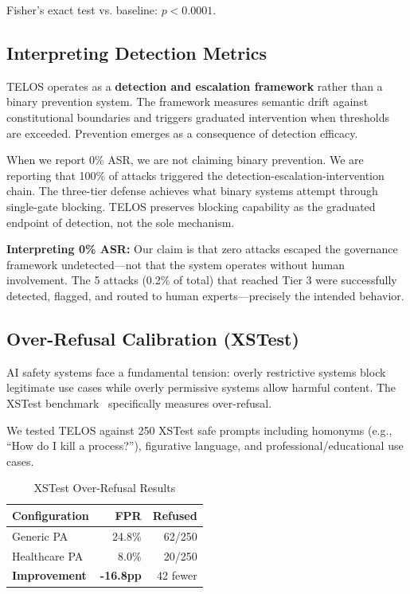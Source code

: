 \documentclass[11pt,twocolumn]{article}
\begin{document}
Fisher's exact test vs. baseline: $p < 0.0001$.

\subsection{Interpreting Detection Metrics}

TELOS operates as a \textbf{detection and escalation framework} rather than a binary prevention system. The framework measures semantic drift against constitutional boundaries and triggers graduated intervention when thresholds are exceeded. Prevention emerges as a consequence of detection efficacy.

When we report 0\% ASR, we are not claiming binary prevention. We are reporting that 100\% of attacks triggered the detection-escalation-intervention chain. The three-tier defense achieves what binary systems attempt through single-gate blocking. TELOS preserves blocking capability as the graduated endpoint of detection, not the sole mechanism.

\textbf{Interpreting 0\% ASR:} Our claim is that zero attacks escaped the governance framework undetected---not that the system operates without human involvement. The 5 attacks (0.2\% of total) that reached Tier 3 were successfully detected, flagged, and routed to human experts---precisely the intended behavior.

\subsection{Over-Refusal Calibration (XSTest)}

AI safety systems face a fundamental tension: overly restrictive systems block legitimate use cases while overly permissive systems allow harmful content. The XSTest benchmark~\citep{rottger2024xstest} specifically measures over-refusal.

We tested TELOS against 250 XSTest safe prompts including homonyms (e.g., ``How do I kill a process?''), figurative language, and professional/educational use cases.

\begin{table}[t]
\centering
\small
\caption{XSTest Over-Refusal Results}
\begin{tabular}{@{}lrr@{}}
\toprule
\textbf{Configuration} & \textbf{FPR} & \textbf{Refused} \\
\midrule
Generic PA & 24.8\% & 62/250 \\
Healthcare PA & 8.0\% & 20/250 \\
\textbf{Improvement} & \textbf{-16.8pp} & 42 fewer \\
\bottomrule
\end{tabular}
\end{table}
\end{document}
